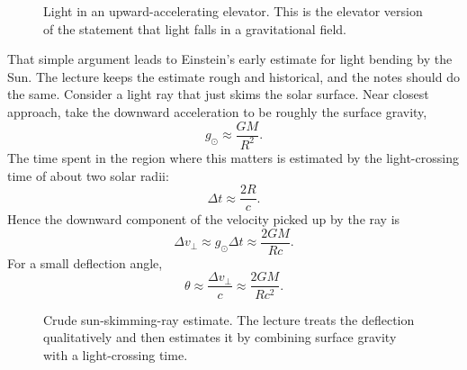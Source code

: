 \begin{figure}[ht]
\centering
{}
\caption{Light in an upward-accelerating elevator. This is the elevator version of the statement that light falls in a gravitational field.}
\end{figure}

That simple argument leads to Einstein's early estimate for light bending by the Sun. The lecture keeps the estimate rough and historical, and the notes should do the same. Consider a light ray that just skims the solar surface. Near closest approach, take the downward acceleration to be roughly the surface gravity,
\begin{equation}
g_\odot \approx \frac{GM}{R^2}.
\end{equation}
The time spent in the region where this matters is estimated by the light-crossing time of about two solar radii:
\begin{equation}
\Delta t \approx \frac{2R}{c}.
\end{equation}
Hence the downward component of the velocity picked up by the ray is
\begin{equation}
\Delta v_\perp \approx g_\odot \Delta t \approx \frac{2GM}{Rc}.
\end{equation}
For a small deflection angle,
\begin{equation}
\theta \approx \frac{\Delta v_\perp}{c}\approx \frac{2GM}{Rc^2}.
\end{equation}

\begin{figure}[ht]
\centering
{}
\caption{Crude sun-skimming-ray estimate. The lecture treats the deflection qualitatively and then estimates it by combining surface gravity with a light-crossing time.}
\end{figure}

